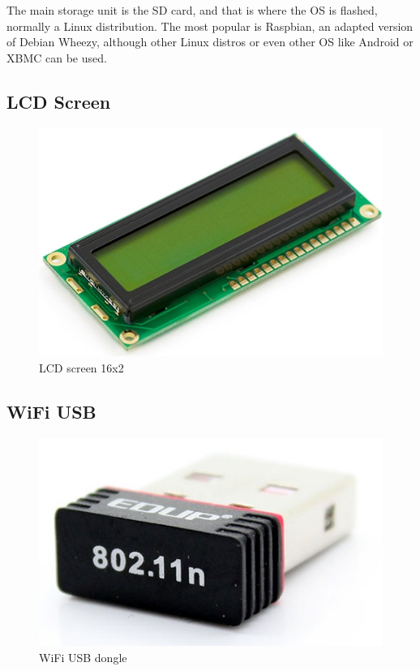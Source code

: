 The main storage unit is the SD card, and that is where the OS is flashed, normally a Linux distribution. The most popular is Raspbian, an adapted version of Debian Wheezy, although other Linux distros or even other OS like Android or XBMC can be used.

\subsection{LCD Screen}

	\begin{figure}[H]
			\centering
			\includegraphics[scale=0.4]{images/ProjectComponents/lcd.jpg}
			\caption{LCD screen 16x2}
			\label{}
	\end{figure}
	\bigskip

\subsection{WiFi USB}

	\begin{figure}[H]
			\centering
			\includegraphics[scale=0.4]{images/ProjectComponents/wifi.jpg}
			\caption{WiFi USB dongle}
			\label{}
	\end{figure}
	\bigskip

